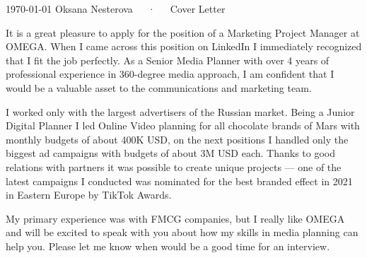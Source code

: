 \documentclass[11pt, a4paper]{awesome-cv}
\begin{document}
\makecvheader[R]

\makecvfooter
  {\today}
  {Oksana Nesterova~~~·~~~Cover Letter}
  {}

\makelettertitle

\begin{cvletter}

It is a great pleasure to apply for the position of a Marketing Project Manager at OMEGA. When I came across this position on LinkedIn I immediately recognized that I fit the job perfectly. As a Senior Media Planner with over 4 years of professional experience in 360-degree media approach, I am confident that I would be a valuable asset to the communications and marketing team.

I worked only with the largest advertisers of the Russian market. Being a Junior Digital Planner I led Online Video planning for all chocolate brands of Mars with monthly budgets of about 400K USD, on the next positions I handled only the biggest ad campaigns with budgets of about 3M USD each. Thanks to good relations with partners it was possible to create unique projects --- one of the latest campaigns I conducted was nominated for the best branded effect in 2021 in Eastern Europe by TikTok Awards.

My primary experience was with FMCG companies, but I really like OMEGA and will be excited to speak with you about how my skills in media planning can help you. Please let me know when would be a good time for an interview.


\end{cvletter}


\makeletterclosing
\end{document}
